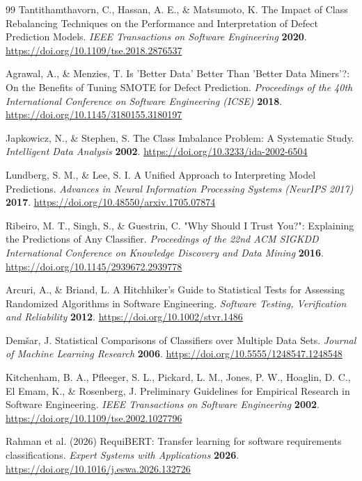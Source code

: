 \begin{thebibliography}{99}
Tantithamthavorn, C., Hassan, A. E., \& Matsumoto, K. The Impact of Class Rebalancing Techniques on the Performance and Interpretation of Defect Prediction Models. \emph{IEEE Transactions on Software Engineering} \textbf{2020}. \url{https://doi.org/10.1109/tse.2018.2876537}

Agrawal, A., \& Menzies, T. Is 'Better Data' Better Than 'Better Data Miners'?: On the Benefits of Tuning SMOTE for Defect Prediction. \emph{Proceedings of the 40th International Conference on Software Engineering (ICSE)} \textbf{2018}. \url{https://doi.org/10.1145/3180155.3180197}

Japkowicz, N., \& Stephen, S. The Class Imbalance Problem: A Systematic Study. \emph{Intelligent Data Analysis} \textbf{2002}. \url{https://doi.org/10.3233/ida-2002-6504}

Lundberg, S. M., \& Lee, S. I. A Unified Approach to Interpreting Model Predictions. \emph{Advances in Neural Information Processing Systems (NeurIPS 2017)} \textbf{2017}. \url{https://doi.org/10.48550/arxiv.1705.07874}

Ribeiro, M. T., Singh, S., \& Guestrin, C. "Why Should I Trust You?": Explaining the Predictions of Any Classifier. \emph{Proceedings of the 22nd ACM SIGKDD International Conference on Knowledge Discovery and Data Mining} \textbf{2016}. \url{https://doi.org/10.1145/2939672.2939778}

Arcuri, A., \& Briand, L. A Hitchhiker's Guide to Statistical Tests for Assessing Randomized Algorithms in Software Engineering. \emph{Software Testing, Verification and Reliability} \textbf{2012}. \url{https://doi.org/10.1002/stvr.1486}

Demšar, J. Statistical Comparisons of Classifiers over Multiple Data Sets. \emph{Journal of Machine Learning Research} \textbf{2006}. \url{https://doi.org/10.5555/1248547.1248548}

Kitchenham, B. A., Pfleeger, S. L., Pickard, L. M., Jones, P. W., Hoaglin, D. C., El Emam, K., \& Rosenberg, J. Preliminary Guidelines for Empirical Research in Software Engineering. \emph{IEEE Transactions on Software Engineering} \textbf{2002}. \url{https://doi.org/10.1109/tse.2002.1027796}

Rahman et al. (2026) RequiBERT: Transfer learning for software requirements classifications. \emph{Expert Systems with Applications} \textbf{2026}. \url{https://doi.org/10.1016/j.eswa.2026.132726}


\end{thebibliography}
